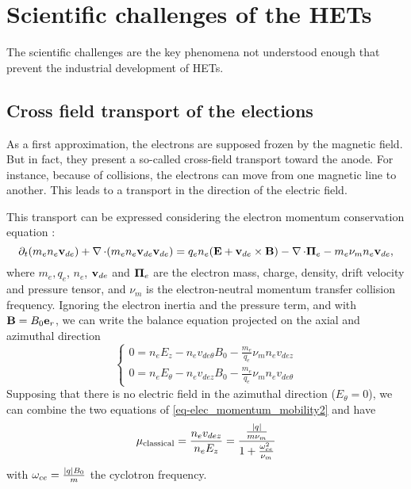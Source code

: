 
\section*{Scientific challenges of the HETs}

The scientific challenges are the key phenomena not understood enough that prevent the industrial development of \ac{HET}s.

\subsection*{Cross field transport of the elections}

  \label{sec-mob}
  As a first approximation, the electrons are supposed frozen by the magnetic field.
  But in fact, they present a so-called cross-field transport toward the anode.
  For instance, because of collisions, the electrons can move from one magnetic line to another.
  This leads to a transport in the direction of the electric field.
  
  This transport can be expressed considering the electron momentum conservation equation \citep{lafleur2016a}\string:
  \begin{equation} \label{eq-elec_momentum_mobility}
    \partial_t(m_e n_e {\mathbf v}_{de}) + \operatorname{{\mathbf \nabla}} \cdot (m_e n_e  {\mathbf v}_{de} {\mathbf v}_{de}) = q_e n_e ( {\mathbf E} + {\mathbf v}_{de} \times {\mathbf B}) - \operatorname{{\mathbf \nabla}} \cdot {\mathbf \Pi}_e - m_e \nu_m n_e {\mathbf v}_{de},
  \end{equation}
  where $m_e, q_e$, $n_e$, ${\mathbf v}_{de}$ and ${\mathbf \Pi}_e $ are the electron mass, charge, density, drift velocity and pressure tensor, and $\nu_m$ is the electron-neutral momentum transfer collision frequency.
  Ignoring the electron inertia and the pressure term, and with ${\mathbf B} = B_0 {\mathbf e}_r$, we can write the balance equation projected on the axial and azimuthal direction
  \begin{equation} \label{eq-elec_momentum_mobility2}
  \begin{cases}
    0 =  n_e E_z - n_e v_{de{\theta}} B_0 - \frac{m_e}{q_e} \nu_m n_e v_{dez}\\
    0 =  n_e E_{\theta} -  n_e v_{dez} B_0 - \frac{m_e}{q_e} \nu_m n_e v_{de{\theta}}
  \end{cases}
  \end{equation}
  Supposing that there is no electric field in the azimuthal direction ($E_{\theta}=0$),  we can combine the two equations of \cref{eq-elec_momentum_mobility2} and have \citep{chen2006,meezan2001}
  \begin{equation} \label{eq-mobility}
    \mu_{\mathrm{classical}} = \frac{n_e v_{dez}}{n_e E_z} = \frac{ \frac{\lvert q\rvert}{m \nu_m}}{1 + \frac{\omega_{ce}^2}{\nu_m}}
  \end{equation}
  with $\omega_{ce}= \frac{\lvert q\rvert B_0}{m}$ the cyclotron frequency.
  
